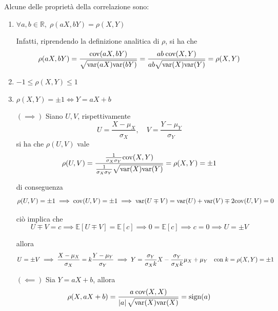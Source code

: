 \documentclass{article}
\begin{document}
            Alcune delle proprietà della correlazione sono:
            \begin{enumerate}
                \item $\forall a, b \in \mathbb{R}, \; \rho(aX, bY) = \rho(X, Y)$

                Infatti, riprendendo la definizione analitica di $\rho$, si ha che
                \[
                    \rho(aX, bY) = \frac{\textnormal{cov}(aX, bY)}{\sqrt{\textnormal{var}(aX)\textnormal{var}(bY)}} = \frac{ab \: \textnormal{cov}(X, Y)}{ab \sqrt{\textnormal{var}(X)\textnormal{var}(Y)}} = \rho(X, Y)
                \]

                \item $-1 \leq \rho(X, Y) \leq 1$

                \item $\rho(X, Y) = \pm 1 \iff Y = a X + b$

                $(\implies)$ Siano $U, V$, rispettivamente
                \[
                    U = \frac{X - \mu_{X}}{\sigma_{X}}, \quad V = \frac{Y - \mu_{Y}}{\sigma_{Y}}
                \]
                si ha che $\rho(U, V)$ vale
                \[
                    \rho(U, V) = \frac{\frac{1}{\sigma_{X}\sigma_{Y}} \textnormal{cov}(X, Y)}{\frac{1}{\sigma_{X}\sigma_{Y}} \sqrt{\textnormal{var}(X)\textnormal{var}(Y)}} = \rho(X, Y) = \pm 1
                \]

                di conseguenza
                \[
                    \rho(U, V) = \pm 1 \implies 
                    \textnormal{cov}(U, V) = \pm 1 \implies
                    \textnormal{var}(U \mp V) = \textnormal{var}(U) + \textnormal{var}(V) \mp 2 \textnormal{cov}(U, V) = 0
                \]

                ciò implica che
                \[
                    U \mp V = c \implies 
                    \mathbb{E}[U \mp V] = \mathbb{E}[c] 
                    \implies 0 = \mathbb{E}[c] \implies 
                    c = 0 \implies 
                    U = \pm V
                \]

                allora
                \[
                    U = \pm V \implies
                    \frac{X - \mu_{X}}{\sigma_{X}} = k \frac{Y - \mu_{Y}}{\sigma_{Y}} \implies
                    Y = \frac{\sigma_{Y}}{\sigma_{X} k} X - \frac{\sigma_{Y}}{\sigma_{X} k} \mu_{X} + \mu_{Y} \quad \textnormal{con} \; k = \rho(X, Y) = \pm 1
                \]

                $(\impliedby)$ Sia $Y = aX + b$, allora
                \[
                    \rho(X, aX + b) = \frac{a \: \textnormal{cov}(X, X)}{\left\lvert a \right\rvert \sqrt{\textnormal{var}(X) \textnormal{var}(X)}} = \textnormal{sign}(a)
                \]
            \end{enumerate}
            
\end{document}
